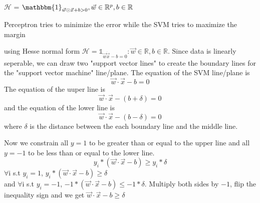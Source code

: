 \documentclass[12pt]{article}
\begin{document}

\begin{enumerate}


$\mathcal{H}$ = {${\mathbbm{1}_{\vec{w}\odot\vec{x}+b>0}}, \vec{w}\in\mathbb{R}^p, b\in\mathbb{R }$}

Perceptron tries to minimize the error while the SVM tries to maximize the margin


using Hesse normal form
$\mathcal{H}= {{\mathbb{1}_{\vec{w}\dot\vec{x}-b=0}}:\vec{w}\in\mathbb{R}, b\in\mathbb{R}}$. Since data is linearly seperable, we can draw two "support vector lines" to create the boundary lines for the "support vector machine" line/plane. 
The equation of the SVM line/plane is \begin{equation}
\vec{w}\cdot\vec{x}-b=0
\end{equation}
The equation of the uuper line is \begin{equation}
\vec{w}\cdot\vec{x}-(b+\delta)=0 
\end{equation}
and the equation of the lower line is \begin{equation}
\vec{w}\cdot\vec{x}-(b-\delta)=0 
\end{equation}
where $\delta$ is the distance between the each boundary line and the middle line.

Now we constrain all $y=1$ to be greater than or equal to the upper line and all $y=-1$ to be less than or equal to the lower line.\\

\begin{equation}
y_i*(\vec{w}\cdot\vec{x}-b)\geq y_i*\delta
\end{equation}
$\forall$i s.t $y_i=1$, $y_i*(\vec{w}\cdot\vec{x}-b)\geq\delta$\\
and $\forall$i s.t $y_i=-1$,
$-1*(\vec{w}\cdot\vec{x}-b)\leq-1*\delta$. Multiply both sides by $-1$, flip the inequality sign and we get $\vec{w}\cdot\vec{x}-b\geq\delta$


\end{enumerate}
\end{document}
